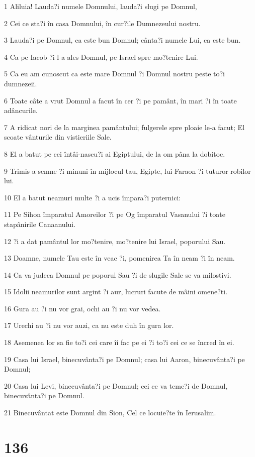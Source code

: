 \par 1 Aliluia! Lauda?i numele Domnului, lauda?i slugi pe Domnul,
\par 2 Cei ce sta?i în casa Domnului, în cur?ile Dumnezeului nostru.
\par 3 Lauda?i pe Domnul, ca este bun Domnul; cânta?i numele Lui, ca este bun.
\par 4 Ca pe Iacob ?i l-a ales Domnul, pe Israel spre mo?tenire Lui.
\par 5 Ca eu am cunoscut ca este mare Domnul ?i Domnul nostru peste to?i dumnezeii.
\par 6 Toate câte a vrut Domnul a facut în cer ?i pe pamânt, în mari ?i în toate adâncurile.
\par 7 A ridicat nori de la marginea pamântului; fulgerele spre ploaie le-a facut; El scoate vânturile din vistieriile Sale.
\par 8 El a batut pe cei întâi-nascu?i ai Egiptului, de la om pâna la dobitoc.
\par 9 Trimis-a semne ?i minuni în mijlocul tau, Egipte, lui Faraon ?i tuturor robilor lui.
\par 10 El a batut neamuri multe ?i a ucis împara?i puternici:
\par 11 Pe Sihon împaratul Amoreilor ?i pe Og împaratul Vasanului ?i toate stapânirile Canaanului.
\par 12 ?i a dat pamântul lor mo?tenire, mo?tenire lui Israel, poporului Sau.
\par 13 Doamne, numele Tau este în veac ?i, pomenirea Ta în neam ?i în neam.
\par 14 Ca va judeca Domnul pe poporul Sau ?i de slugile Sale se va milostivi.
\par 15 Idolii neamurilor sunt argint ?i aur, lucruri facute de mâini omene?ti.
\par 16 Gura au ?i nu vor grai, ochi au ?i nu vor vedea.
\par 17 Urechi au ?i nu vor auzi, ca nu este duh în gura lor.
\par 18 Asemenea lor sa fie to?i cei care îi fac pe ei ?i to?i cei ce se încred în ei.
\par 19 Casa lui Israel, binecuvânta?i pe Domnul; casa lui Aaron, binecuvânta?i pe Domnul;
\par 20 Casa lui Levi, binecuvânta?i pe Domnul; cei ce va teme?i de Domnul, binecuvânta?i pe Domnul.
\par 21 Binecuvântat este Domnul din Sion, Cel ce locuie?te în Ierusalim.

\chapter{136}

